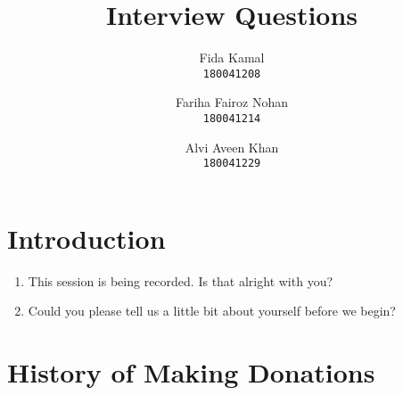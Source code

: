 \documentclass[11pt]{article}
\begin{document}
    \title {Interview Questions}
    \author {
        Fida Kamal\\
        \texttt{180041208}
        \and
        Fariha Fairoz Nohan\\
        \texttt{180041214}
        \and
        Alvi Aveen Khan\\
        \texttt{180041229}
    }
    \maketitle
    
    \section {Introduction}
 
    \begin{enumerate}
        \item This session is being recorded. Is that alright with you?
        \item Could you please tell us a little bit about yourself before we begin?
    \end{enumerate}
    
    \section {History of Making Donations}
    
\end{document}
